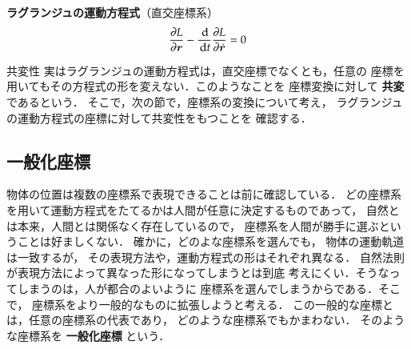                 \begin{center}
                    \begin{itembox}[l]{\textbf{ラグランジュの運動方程式}（直交座標系）}
                        \begin{align}
                            \frac{\partial L}{\partial \boldsymbol{r}}
                            -\frac{\,\mathrm{d} }{\,\mathrm{d} t} \frac{\partial L}{\partial \dot{\boldsymbol{r}}}=0
                        \end{align}
                    \end{itembox}
                \end{center}

            \begin{memo}{共変性}
                実はラグランジュの運動方程式は，直交座標でなくとも，任意の
                座標を用いてもその方程式の形を変えない．このようなことを
                座標変換に対して \textbf{共変} であるという．
                そこで，次の節で，座標系の変換について考え，
                ラグランジュの運動方程式の座標に対して共変性をもつことを
                確認する．
            \end{memo}

        \subsection{一般化座標}
            物体の位置は複数の座標系で表現できることは前に確認している．
            どの座標系を用いて運動方程式をたてるかは人間が任意に決定するものであって，
            自然とは本来，人間とは関係なく存在しているので，
            座標系を人間が勝手に選ぶということは好ましくない．
            確かに，どのよな座標系を選んでも，
            物体の運動軌道は一致するが，
            その表現方法や，運動方程式の形はそれぞれ異なる．
            自然法則が表現方法によって異なった形になってしまうとは到底
            考えにくい．そうなってしまうのは，人が都合のよいように
            座標系を選んでしまうからである．そこで，
            座標系をより一般的なものに拡張しようと考える．
            この一般的な座標とは，任意の座標系の代表であり，
            どのような座標系でもかまわない．
            そのような座標系を \textbf{一般化座標} という．

